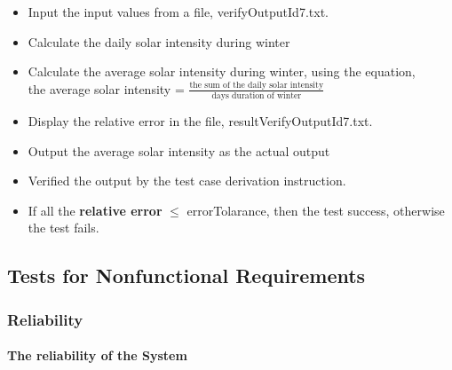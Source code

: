 \documentclass[12pt, titlepage]{article}
\begin{document}
\begin{enumerate}
\begin{itemize} 
\item Input the input values from a file, verifyOutputId7.txt. 
\item Calculate the daily solar intensity during winter 
\item Calculate the average solar intensity during winter, using the equation,\\the average solar intensity = $\frac{\text{the sum of the daily solar
intensity}}{\text{days duration of winter}}$
\item Display the relative error in the file, resultVerifyOutputId7.txt. 
\item Output the average solar intensity as the actual output
\item Verified the output by the test case derivation instruction. 
\item If all the \textbf{relative error}  $\leq$ errorTolarance, then the
test success, otherwise the test fails.
\end{itemize}
\end{enumerate}

\subsection{Tests for Nonfunctional Requirements}

 

\subsubsection{Reliability}
\paragraph{The reliability of the System}
\end{document}
